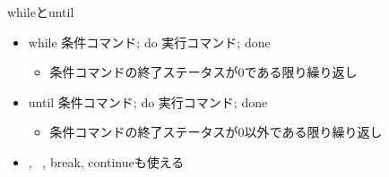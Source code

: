 \documentclass[12pt,aspectratio=169]{beamer}
\begin{document}
\begin{frame}{whileとuntil}

  \begin{itemize}
    \item while 条件コマンド; do 実行コマンド; done\\
    \begin{itemize}
      \item 条件コマンドの終了ステータスが0である限り繰り返し
    \end{itemize}
    \item until 条件コマンド; do 実行コマンド; done\\
    \begin{itemize}
      \item 条件コマンドの終了ステータスが0以外である限り繰り返し
    \end{itemize}
    \item \lbrack, \lbrack\lbrack\ \rbrack\rbrack, break, continueも使える
  \end{itemize}

\end{frame}
\end{document}
